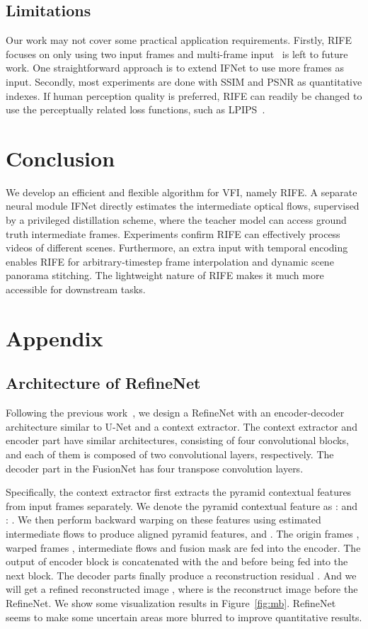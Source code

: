 \documentclass[final]{cvpr}
\begin{document}
\subsection{Limitations}
\label{sec:limitation}
Our work may not cover some practical application requirements. Firstly, RIFE focuses on only using two input frames and multi-frame input~\cite{xu2019quadratic, liu2020enhanced, kalluri2020flavr} is left to future work. One straightforward approach is to extend IFNet to use more frames as input. Secondly, most experiments are done with SSIM and PSNR as quantitative indexes. If human perception quality is preferred, RIFE can readily be changed to use the perceptually related loss functions, such as LPIPS~\cite{blau2018perception, niklaus2017video}.

 	\section{Conclusion}
We develop an efficient and flexible algorithm for VFI, namely RIFE. A separate neural module IFNet directly estimates the intermediate optical flows, supervised by a privileged distillation scheme, where the teacher model can access ground truth intermediate frames. Experiments confirm RIFE can effectively process videos of different scenes. Furthermore, an extra input with temporal encoding enables RIFE for arbitrary-timestep frame interpolation and dynamic scene panorama stitching. The lightweight nature of RIFE makes it much more accessible for downstream tasks.     
{\small
		    
		
	}
	\clearpage
\section{Appendix}

\subsection{Architecture of RefineNet}
Following the previous work~\cite{niklaus2020softmax}, we design a RefineNet with an encoder-decoder architecture similar to U-Net and a context extractor. The context extractor and encoder part have similar architectures, consisting of four convolutional blocks, and each of them is composed of two  convolutional layers, respectively. The decoder part in the FusionNet has four transpose convolution layers. 

Specifically, the context extractor first extracts the pyramid contextual features from input frames separately. We denote the pyramid contextual feature as :  and : . We then perform backward warping on these features using estimated intermediate flows to produce aligned pyramid features,  and . The origin frames , warped frames , intermediate flows  and fusion mask  are fed into the encoder. The output of  encoder block is concatenated with the  and  before being fed into the next block. The decoder parts finally produce a reconstruction residual . And we will get a refined reconstructed image , where  is the reconstruct image before the RefineNet. We show some visualization results in Figure~\ref{fig:mb}. RefineNet seems to make some uncertain areas more blurred to improve quantitative results. 
\end{document}
